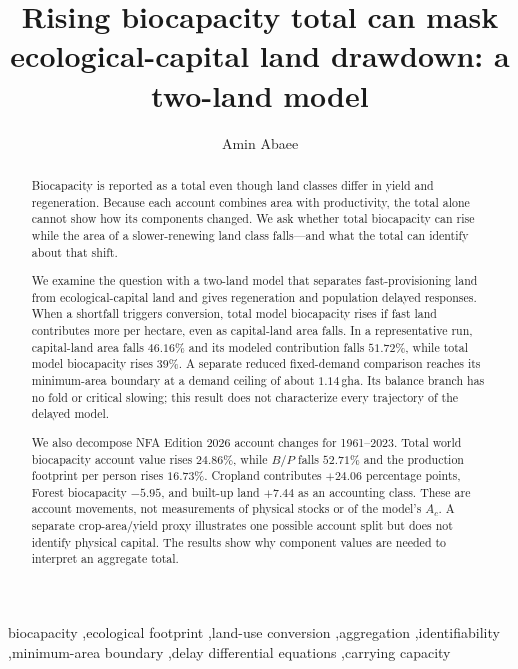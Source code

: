 \documentclass[preprint,12pt,authoryear]{elsarticle}
\begin{document}
\begin{frontmatter}

\title{Rising biocapacity total can mask ecological-capital land drawdown: a two-land model}

\author[1]{Amin Abaee}

\begin{abstract}
\footnotesize
Biocapacity is reported as a total even though land classes differ in yield and regeneration. Because each account combines area with productivity, the total alone cannot show how its components changed. We ask whether total biocapacity can rise while the area of a slower-renewing land class falls—and what the total can identify about that shift.

We examine the question with a two-land model that separates fast-provisioning land from ecological-capital land and gives regeneration and population delayed responses. When a shortfall triggers conversion, total model biocapacity rises if fast land contributes more per hectare, even as capital-land area falls. In a representative run, capital-land area falls $46.16\%$ and its modeled contribution falls $51.72\%$, while total model biocapacity rises $39\%$. A separate reduced fixed-demand comparison reaches its minimum-area boundary at a demand ceiling of about $1.14$\,gha. Its balance branch has no fold or critical slowing; this result does not characterize every trajectory of the delayed model.

We also decompose NFA Edition 2026 account changes for 1961--2023. Total world biocapacity account value rises $24.86\%$, while $B/P$ falls $52.71\%$ and the production footprint per person rises $16.73\%$. Cropland contributes $+24.06$ percentage points, Forest biocapacity $-5.95$, and built-up land $+7.44$ as an accounting class. These are account movements, not measurements of physical stocks or of the model's $A_c$. A separate crop-area/yield proxy illustrates one possible account split but does not identify physical capital. The results show why component values are needed to interpret an aggregate total.
\end{abstract}

\begin{keyword}
\footnotesize
biocapacity \sep ecological footprint \sep land-use conversion \sep aggregation \sep identifiability \sep minimum-area boundary \sep delay differential equations \sep carrying capacity
\end{keyword}

\end{frontmatter}
\end{document}
